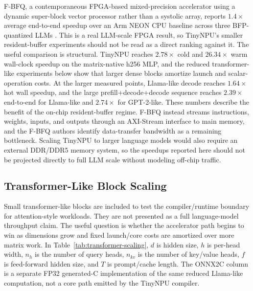 \documentclass[a4paper, 12pt, titlepage]{article}
\begin{document}
F-BFQ, a contemporaneous FPGA-based mixed-precision accelerator using a dynamic super-block vector processor rather than a systolic array, reports \(1.4\times\) average end-to-end speedup over an Arm NEON CPU baseline across three BFP-quantized LLMs \cite{haris2025fbfq}. This is a real LLM-scale FPGA result, so TinyNPU's smaller resident-buffer experiments should not be read as a direct ranking against it. The useful comparison is structural. TinyNPU reaches \(2.78\times\) cold and \(26.34\times\) warm wall-clock speedup on the matrix-native h256 MLP, and the reduced transformer-like experiments below show that larger dense blocks amortize launch and scalar-operation costs. At the larger measured points, Llama-like decode reaches \(1.64\times\) hot wall speedup, and the large prefill+decode+decode sequence reaches \(2.39\times\) end-to-end for Llama-like and \(2.74\times\) for GPT-2-like. These numbers describe the benefit of the on-chip resident-buffer regime. F-BFQ instead streams instructions, weights, inputs, and outputs through an AXI-Stream interface to main memory, and the F-BFQ authors identify data-transfer bandwidth as a remaining bottleneck. Scaling TinyNPU to larger language models would also require an external DDR/DDR5 memory system, so the speedups reported here should not be projected directly to full LLM scale without modeling off-chip traffic.

\subsection{Transformer-Like Block Scaling}

Small transformer-like blocks are included to test the compiler/runtime boundary for attention-style workloads. They are not presented as a full language-model throughput claim. The useful question is whether the accelerator path begins to win as dimensions grow and fixed launch/core costs are amortized over more matrix work. In Table~\ref{tab:transformer-scaling}, \(d\) is hidden size, \(h\) is per-head width, \(n_h\) is the number of query heads, \(n_{kv}\) is the number of key/value heads, \(f\) is feed-forward hidden size, and \(T\) is prompt/cache length. The ONNX2C column is a separate FP32 generated-C implementation of the same reduced Llama-like computation, not a core path emitted by the TinyNPU compiler.
\end{document}
